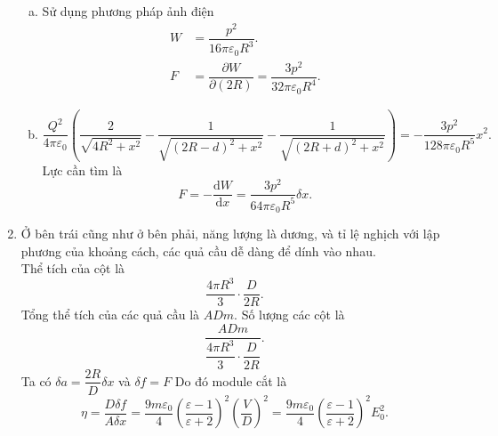 \begin{loigiai}
\begin{enumerate}[1)]
\begin{enumerate}[a)]
        \item Sử dụng phương pháp ảnh điện 
        \begin{align*}
            W&=\dfrac{p^2}{16\pi\varepsilon_0R^3}.\\
            F&=\dfrac{\partial W}{\partial(2R)}=\dfrac{3p^2}{32\pi\varepsilon_0R^4}.
        \end{align*}
        \item
        \[\dfrac{Q^2}{4\pi\varepsilon_0}\left(\dfrac{2}{\sqrt{4R^2+x^2}}-\dfrac{1}{\sqrt{(2R-d)^2+x^2}}-\dfrac{1}{\sqrt{(2R+d)^2+x^2}}\right)=-\dfrac{3p^2}{128\pi\varepsilon_0R^5}x^2.\]
        Lực cần tìm là
        \[F=-\dfrac{\mathrm{d}W}{\mathrm{d}x}=\dfrac{3p^2}{64\pi\varepsilon_0R^5}\delta x.\]
    \end{enumerate}
    \item Ở bên trái cũng như ở bên phải, năng lượng là dương, và tỉ lệ nghịch với lập phương của khoảng cách, các quả cầu dễ dàng để dính vào nhau.\\
    Thể tích của cột là
    \[\dfrac{4\pi R^3}{3}\cdot\dfrac{D}{2R}.\]
    Tổng thể tích của các quả cầu là $ADm$. Số lượng các cột là
    \[\dfrac{ADm}{\dfrac{4\pi R^3}{3}\cdot\dfrac{D}{2R}}.\]
    Ta có $\delta a=\dfrac{2R}{D}\delta x$ và $\delta f=F$
    Do đó module cắt là
    \[\eta=\dfrac{D\delta f}{A\delta x}=\dfrac{9m\varepsilon_0}{4}\left(\dfrac{\varepsilon-1}{\varepsilon+2}\right)^2\left(\dfrac{V}{D}\right)^2=\dfrac{9m\varepsilon_0}{4}\left(\dfrac{\varepsilon-1}{\varepsilon+2}\right)^2E_0^2.\]

\end{enumerate}
\end{loigiai}

